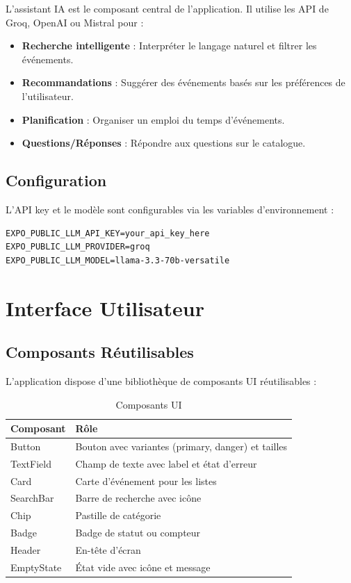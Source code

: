\documentclass[12pt,a4paper]{article}
\begin{document}
L'assistant IA est le composant central de l'application. Il utilise les API de Groq, OpenAI ou Mistral pour :

\begin{itemize}
    \item \textbf{Recherche intelligente} : Interpréter le langage naturel et filtrer les événements.
    \item \textbf{Recommandations} : Suggérer des événements basés sur les préférences de l'utilisateur.
    \item \textbf{Planification} : Organiser un emploi du temps d'événements.
    \item \textbf{Questions/Réponses} : Répondre aux questions sur le catalogue.
\end{itemize}

\subsection{Configuration}

L'API key et le modèle sont configurables via les variables d'environnement :

\begin{lstlisting}
EXPO_PUBLIC_LLM_API_KEY=your_api_key_here
EXPO_PUBLIC_LLM_PROVIDER=groq
EXPO_PUBLIC_LLM_MODEL=llama-3.3-70b-versatile
\end{lstlisting}

\section{Interface Utilisateur}

\subsection{Composants Réutilisables}

L'application dispose d'une bibliothèque de composants UI réutilisables :

\begin{table}[H]
    \centering
    \begin{tabularx}{\textwidth}{|l|X|}
        \hline
        \textbf{Composant} & \textbf{Rôle} \\
        \hline
        Button & Bouton avec variantes (primary, danger) et tailles \\
        TextField & Champ de texte avec label et état d'erreur \\
        Card & Carte d'événement pour les listes \\
        SearchBar & Barre de recherche avec icône \\
        Chip & Pastille de catégorie \\
        Badge & Badge de statut ou compteur \\
        Header & En-tête d'écran \\
        EmptyState & État vide avec icône et message \\
        \hline
    \end{tabularx}
    \caption{Composants UI}
\end{table}
\end{document}

